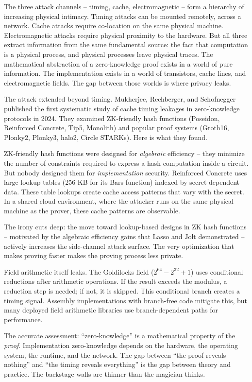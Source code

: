 \documentclass[
  11pt,
  openany]{report}
\begin{document}
The three attack channels -- timing, cache, electromagnetic -- form a hierarchy
of increasing physical intimacy. Timing attacks can be mounted remotely, across
a network. Cache attacks require co-location on the same physical machine.
Electromagnetic attacks require physical proximity to the hardware. But all
three extract information from the same fundamental source: the fact that
computation is a physical process, and physical processes leave physical traces.
The mathematical abstraction of a zero-knowledge proof exists in a world of pure
information. The implementation exists in a world of transistors, cache lines,
and electromagnetic fields. The gap between those worlds is where privacy leaks.

The attack extended beyond timing. Mukherjee, Rechberger, and Schofnegger
published the first systematic study of cache timing leakages in zero-knowledge
protocols in 2024. They examined ZK-friendly hash functions (Poseidon,
Reinforced Concrete, Tip5, Monolith) and popular proof systems (Groth16,
Plonky2, Plonky3, halo2, Circle STARKs). Here is what they found.

ZK-friendly hash functions were designed for \emph{algebraic} efficiency -- they
minimize the number of constraints required to express a hash computation inside
a circuit. But nobody designed them for \emph{implementation} security.
Reinforced Concrete uses large lookup tables (256 KB for its Bars function)
indexed by secret-dependent data. These table lookups create cache access
patterns that vary with the secret. In a shared cloud environment, where the
attacker runs on the same physical machine as the prover, these cache patterns
are observable.

The irony cuts deep: the move toward lookup-based designs in ZK hash functions
-- motivated by the algebraic efficiency gains that Lasso and Jolt demonstrated
-- actively increases the side-channel attack surface. The very optimization
that makes proving faster makes the proving process less private.

Field arithmetic itself leaks. The Goldilocks field (\(2^{64} - 2^{32} + 1\))
uses conditional reductions after arithmetic operations. If the result exceeds
the modulus, a reduction step is needed; if not, it is skipped. This conditional
branch creates a timing signal. Assembly implementations with branch-free code
mitigate this, but many deployed field arithmetic libraries use branch-dependent
paths for performance.

The accurate assessment: ``zero-knowledge'' is a mathematical property of the
\emph{proof}. Implementation zero-knowledge depends on the hardware, the
operating system, the runtime, and the network. The gap between ``the proof
reveals nothing'' and ``the timing reveals everything'' is the gap between
theory and practice. The backstage walls are thinner than the magician thinks.
\end{document}
